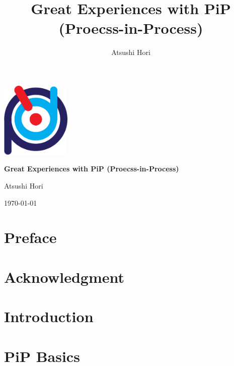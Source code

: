 \documentclass[a4paper,11pt,makeidx]{report} %
\title{Great Experiences with PiP (Proecss-in-Process)} %
\author{Atsushi Hori} %
\begin{document}
\begin{titlepage}
	\centering
	\includegraphics[width=0.25\textwidth]{Figs/PiP-logo.pdf}
        \par\vspace{3cm}
	{\huge\bfseries Great Experiences with PiP (Proecss-in-Process)\par}
	\vspace{9cm}
	{\Large Atsushi Hori\par}
	\vfill
	{\Large \today\par}
\end{titlepage}

\newpage %


\chapter*{Preface}


\tableofcontents %
\listoffigures
\listoftables
\lstlistoflistings

\chapter*{Acknowledgment}


\chapter*{Introduction}
\label{sec:intro}

\chapter{PiP Basics}\label{chap:basics}







\end{document}
